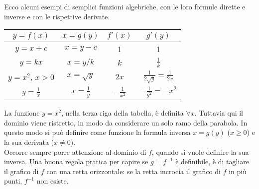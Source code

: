 Ecco alcuni esempi di semplici funzioni algebriche, con le loro 
formule dirette e inverse e con le rispettive derivate.
\begin{center}
\begin{tabular}{|c|c|c|c|}
$y=f(x)$ & $x=g(y)$ & $f'(x)$ & $g'(y)$\\\hline
$y=x+c$ & $x=y-c$ & 1 & 1\\
$y=kx$ & $x=y/k$ & $k$ & $\frac{1}{k}$\\
$y=x^2$, $x > 0$ & $x=\sqrt{y}$ & $2x$ & 
$\frac{1}{2\sqrt{y}}=\frac{1}{2x}$\\
$y=\frac{1}{x}$ & $x=\frac{1}{y}$ & $-\frac{1}{x^2}$ & 
$-\frac{1}{y^2}=-x^2$\\
\hline
\end{tabular}
\end{center}

\begin{osservazione}
La funzione  $y=x^2$, nella terza riga della tabella, è definita $\forall x$.
Tuttavia qui il dominio viene ristretto, in modo da considerare un solo ramo 
della parabola. In questo modo si può definire come funzione la formula inversa
$x=g(y)$ ($x\ge 0$) e la sua derivata ($x\ne 0$).\\
Occorre sempre porre attenzione al dominio di $f$, quando si vuole 
definire la sua inversa. Una buona regola pratica per capire se $g=f^{-1}$ è 
definibile, è di tagliare il grafico di $f$ con una retta orizzontale: se la
retta incrocia il grafico di $f$ in più punti, $f^{-1}$ non esiste.
\end{osservazione}



